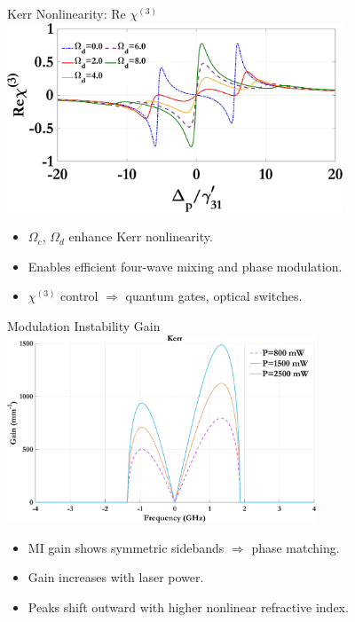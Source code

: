 \documentclass[12pt,aspectratio=1610]{beamer}
\begin{document}
\begin{frame}{Kerr Nonlinearity: Re $\chi^{(3)}$}
  \vspace{-4pt}
  \hspace*{36pt}
  \includegraphics[width=0.75\textwidth]{Assets/Real_chi3_Omega_d.jpeg}
  \begin{itemize}
    \item $\Omega_c$, $\Omega_d$ enhance Kerr nonlinearity.
    \item Enables efficient four-wave mixing and phase modulation.
    \item $\chi^{(3)}$ control $\Rightarrow$ quantum gates, optical switches.
  \end{itemize}
\end{frame}

\begin{frame}{Modulation Instability Gain}
  \hspace*{40pt}
  \includegraphics[width=0.69\textwidth]{Assets/G_v_Power.jpeg}
  \begin{itemize}
    \item MI gain shows symmetric sidebands $\Rightarrow$ phase matching.
    \item Gain increases with laser power.
    \item Peaks shift outward with higher nonlinear refractive index.
  \end{itemize}
\end{frame}
\end{document}
